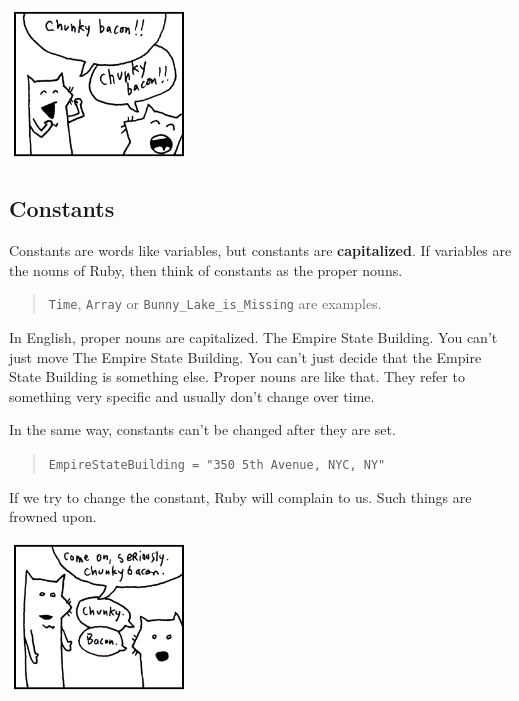 \documentclass[10pt,twoside]{report}
\begin{document}
	\includegraphics[width=0.3575\textwidth]{cache/10.png}




\subsection{Constants}



Constants are words like variables, but constants are {\bf
  capitalized}.  If variables are the nouns of Ruby, then think of
constants as the proper nouns.

\begin{quote}
\lstinline[breaklines=true]|Time|, \lstinline[breaklines=true]|Array|
or \lstinline[breaklines=true]|Bunny_Lake_is_Missing| are
examples.\end{quote}


In English, proper nouns are capitalized.  The Empire State Building.
You can't just move The Empire State Building.  You can't just decide
that the Empire State Building is something else. Proper nouns are
like that.  They refer to something very specific and usually don't
change over time.

In the same way, constants can't be changed after they are set.

\begin{quote}
\lstinline[breaklines=true]|EmpireStateBuilding = "350 5th Avenue, NYC, NY"|\end{quote}


If we try to change the constant, Ruby will complain to us.  Such
things are frowned upon.

	\includegraphics[width=0.3575\textwidth]{cache/11.png}
\end{document}
